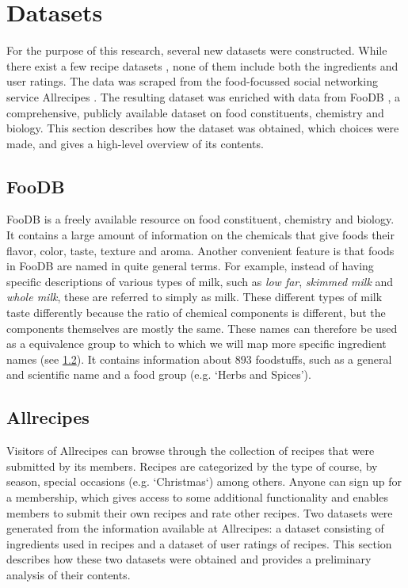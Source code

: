 \section{Datasets}
\label{sec:dataset}

For the purpose of this research, several new datasets were constructed.
While there exist a few recipe datasets \citep{Kaggle, DataHub}, none of them include both the ingredients and user ratings.
The data was scraped from the food-focussed social networking service Allrecipes \citep{Allrecipes}.
The resulting dataset was enriched with data from FooDB \citep{FooDB}, a comprehensive, publicly available dataset on food constituents, chemistry and biology.
This section describes how the dataset was obtained, which choices were made, and gives a high-level overview of its contents.




\subsection{FooDB}
\label{subsec:foodb}

FooDB is a freely available resource on food constituent, chemistry and biology.
It contains a large amount of information on the chemicals that give foods their flavor, color, taste, texture and aroma.
Another convenient feature is that foods in FooDB are named in quite general terms.
For example, instead of having specific descriptions of various types of milk, such as \emph{low far}, \emph{skimmed milk} and \emph{whole milk}, these are referred to simply as milk.
These different types of milk taste differently because the ratio of chemical components is different, but the components themselves are mostly the same.
These names can therefore be used as a equivalence group to which to which we will map more specific ingredient names (see \cref{subsec:allrecipes}).
It contains information about $893$ foodstuffs, such as a general and scientific name and a food group (e.g. `Herbs and Spices').




\subsection{Allrecipes}
\label{subsec:allrecipes}

Visitors of Allrecipes can browse through the collection of recipes that were submitted by its members.
Recipes are categorized by the type of course, by season, special occasions (e.g. `Christmas`) among others.
Anyone can sign up for a membership, which gives access to some additional functionality and enables members to submit their own recipes and rate other recipes.
Two datasets were generated from the information available at Allrecipes: a dataset consisting of ingredients used in recipes and a dataset of user ratings of recipes.
This section describes how these two datasets were obtained and provides a preliminary analysis of their contents.


